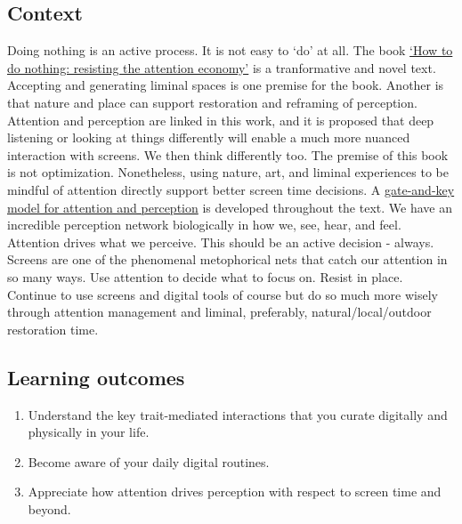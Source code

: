 \documentclass[
]{book}
\providecommand{\tightlist}{%
  \setlength{\itemsep}{0pt}\setlength{\parskip}{0pt}}
\begin{document}
\hypertarget{context-2}{%
\subsection*{Context}\label{context-2}}

Doing nothing is an active process. It is not easy to `do' at all. The book \href{https://www.penguinrandomhouse.com/books/600671/how-to-do-nothing-by-jenny-odell/}{`How to do nothing: resisting the attention economy'} is a tranformative and novel text. Accepting and generating liminal spaces is one premise for the book. Another is that nature and place can support restoration and reframing of perception. Attention and perception are linked in this work, and it is proposed that deep listening or looking at things differently will enable a much more nuanced interaction with screens. We then think differently too. The premise of this book is not optimization. Nonetheless, using nature, art, and liminal experiences to be mindful of attention directly support better screen time decisions. A \href{https://www.frontiersin.org/articles/10.3389/fpsyg.2015.00500/full}{gate-and-key model for attention and perception} is developed throughout the text. We have an incredible perception network biologically in how we, see, hear, and feel. Attention drives what we perceive. This should be an active decision - always. Screens are one of the phenomenal metophorical nets that catch our attention in so many ways. Use attention to decide what to focus on. Resist in place. Continue to use screens and digital tools of course but do so much more wisely through attention management and liminal, preferably, natural/local/outdoor restoration time.

\hypertarget{learning-outcomes-2}{%
\subsection*{Learning outcomes}\label{learning-outcomes-2}}

\begin{enumerate}
\def\labelenumi{\arabic{enumi}.}
\tightlist
\item
  Understand the key trait-mediated interactions that you curate digitally and physically in your life.\\
\item
  Become aware of your daily digital routines.\\
\item
  Appreciate how attention drives perception with respect to screen time and beyond.
\end{enumerate}
\end{document}
